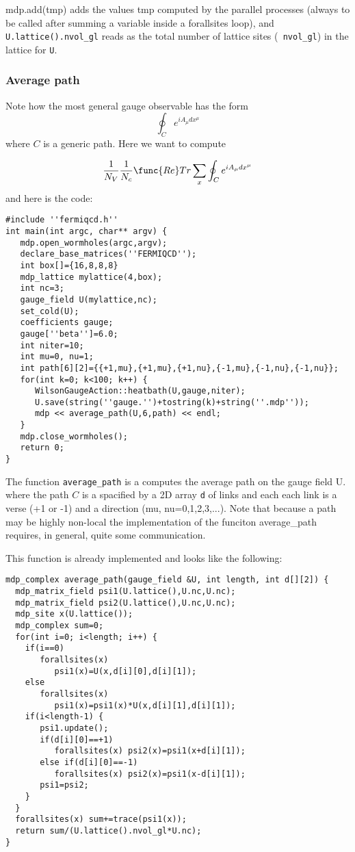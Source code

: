 mdp.add(tmp) adds the values tmp computed by the parallel processes (always
to be called after summing a variable inside a forallsites loop), and {\tt %
U.lattice().nvol\_gl} reads as the total number of lattice sites ({\tt %
nvol\_gl}) in the lattice for {\tt U}.

\subsubsection{Average path}

Note how the most general gauge observable has the form
\[
\oint_Ce^{iA_\mu dx^\mu }
\]
where $C$ is a generic path. Here we want to compute

\[
\frac 1{N_V}\frac 1{N_c}\func{Re}Tr\sum_x\oint_Ce^{iA_\mu dx^\mu }
\]
and here is the code:
\begin{verbatim}
#include ''fermiqcd.h''
int main(int argc, char** argv) {
   mdp.open_wormholes(argc,argv);
   declare_base_matrices(''FERMIQCD'');
   int box[]={16,8,8,8}
   mdp_lattice mylattice(4,box);
   int nc=3;
   gauge_field U(mylattice,nc);
   set_cold(U);
   coefficients gauge;
   gauge[''beta'']=6.0;
   int niter=10;
   int mu=0, nu=1;
   int path[6][2]={{+1,mu},{+1,mu},{+1,nu},{-1,mu},{-1,nu},{-1,nu}};
   for(int k=0; k<100; k++) {
      WilsonGaugeAction::heatbath(U,gauge,niter);
      U.save(string(''gauge.'')+tostring(k)+string(''.mdp''));
      mdp << average_path(U,6,path) << endl;
   }
   mdp.close_wormholes();
   return 0;
}
\end{verbatim}

The function {\tt average\_path} is a computes the average path on the gauge
field U. where the path $C$ is a spacified by a 2D array {\tt d} of links
and each each link is a verse (+1 or -1) and a direction (mu,
nu=0,1,2,3,...). Note that because a path may be highly non-local the
implementation of the funciton average\_path requires, in general, quite
some communication.

This function is already implemented and looks like the following: 
\begin{verbatim}
mdp_complex average_path(gauge_field &U, int length, int d[][2]) {
  mdp_matrix_field psi1(U.lattice(),U.nc,U.nc);
  mdp_matrix_field psi2(U.lattice(),U.nc,U.nc);
  mdp_site x(U.lattice());
  mdp_complex sum=0;
  for(int i=0; i<length; i++) {
    if(i==0) 
       forallsites(x) 
          psi1(x)=U(x,d[i][0],d[i][1]);
    else
       forallsites(x) 
          psi1(x)=psi1(x)*U(x,d[i][1],d[i][1]);
    if(i<length-1) {
       psi1.update();    
       if(d[i][0]==+1)
          forallsites(x) psi2(x)=psi1(x+d[i][1]);
       else if(d[i][0]==-1)
          forallsites(x) psi2(x)=psi1(x-d[i][1]);
       psi1=psi2;
    }
  }
  forallsites(x) sum+=trace(psi1(x));
  return sum/(U.lattice().nvol_gl*U.nc);
}
\end{verbatim}

